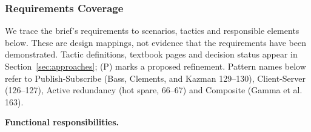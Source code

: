 \subsubsection{Requirements Coverage}
\label{sec:requirements-coverage}
We trace the brief's requirements to scenarios, tactics and responsible elements below.
These are design mappings, not evidence that the requirements have been demonstrated.
Tactic definitions, textbook pages and decision status appear in
Section~\ref{sec:approaches}; (P) marks a proposed refinement. Pattern names below
refer to Publish-Subscribe (Bass, Clements, and Kazman 129--130), Client-Server
(126--127), Active redundancy (hot spare, 66--67) and Composite (Gamma et al. 163).

\begingroup
\footnotesize
\setlength{\tabcolsep}{3pt}
\renewcommand{\arraystretch}{1.05}
\noindent\textbf{Functional responsibilities.}\par\nopagebreak[4]
\noindent
